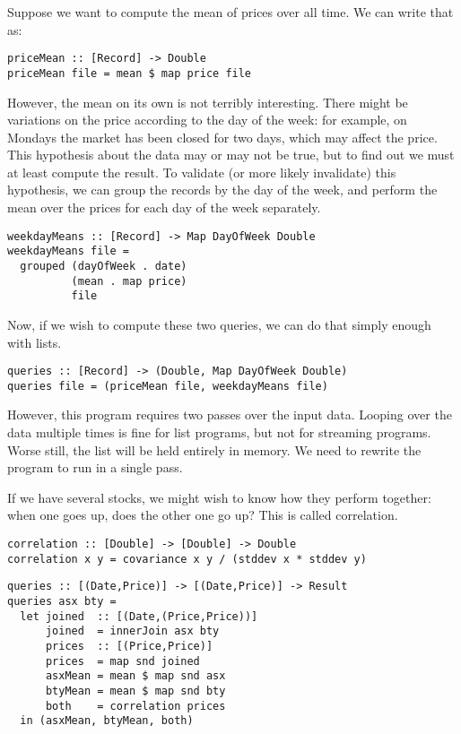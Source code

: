 Suppose we want to compute the mean of prices over all time.
We can write that as:

\begin{lstlisting}
priceMean :: [Record] -> Double
priceMean file = mean $ map price file
\end{lstlisting}

However, the mean on its own is not terribly interesting.
There might be variations on the price according to the day of the week: for example, on Mondays the market has been closed for two days, which may affect the price.
This hypothesis about the data may or may not be true, but to find out we must at least compute the result.
To validate (or more likely invalidate) this hypothesis, we can group the records by the day of the week, and perform the mean over the prices for each day of the week separately.

\begin{lstlisting}
weekdayMeans :: [Record] -> Map DayOfWeek Double
weekdayMeans file = 
  grouped (dayOfWeek . date)
          (mean . map price)
          file
\end{lstlisting}

Now, if we wish to compute these two queries, we can do that simply enough with lists.
\begin{lstlisting}
queries :: [Record] -> (Double, Map DayOfWeek Double)
queries file = (priceMean file, weekdayMeans file)
\end{lstlisting}

However, this program requires two passes over the input data.
Looping over the data multiple times is fine for list programs, but not for streaming programs.
Worse still, the list will be held entirely in memory.
We need to rewrite the program to run in a single pass.

If we have several stocks, we might wish to know how they perform together: when one goes up, does the other one go up?
This is called correlation.

\begin{lstlisting}
correlation :: [Double] -> [Double] -> Double
correlation x y = covariance x y / (stddev x * stddev y)
\end{lstlisting}

\begin{lstlisting}
queries :: [(Date,Price)] -> [(Date,Price)] -> Result
queries asx bty =
  let joined  :: [(Date,(Price,Price))]
      joined  = innerJoin asx bty
      prices  :: [(Price,Price)]
      prices  = map snd joined
      asxMean = mean $ map snd asx
      btyMean = mean $ map snd bty
      both    = correlation prices
  in (asxMean, btyMean, both)
\end{lstlisting}

